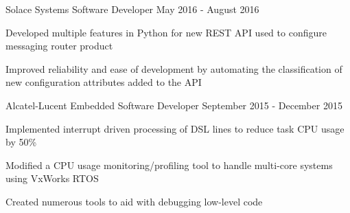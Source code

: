 \begin{cventries}
  \cventry
    {Solace Systems} %
    {Software Developer} %
    {May 2016 - August 2016} %
    {}
    {
      \begin{cvitems} %
        \item {Developed multiple features in Python for new REST API used to configure messaging router product}
        \item {Improved reliability and ease of development by automating the classification of new configuration attributes added to the API}
      \end{cvitems}
    }

  \cventry
    {Alcatel-Lucent} %
    {Embedded Software Developer} %
    {September 2015 - December 2015} %
    {}
    {
      \begin{cvitems} %
        \item {Implemented interrupt driven processing of DSL lines to reduce task CPU usage by 50\%}
        \item {Modified a CPU usage monitoring/profiling tool to handle multi-core systems using VxWorks RTOS}
        \item {Created numerous tools to aid with debugging low-level code}
      \end{cvitems}
    }


\end{cventries}
